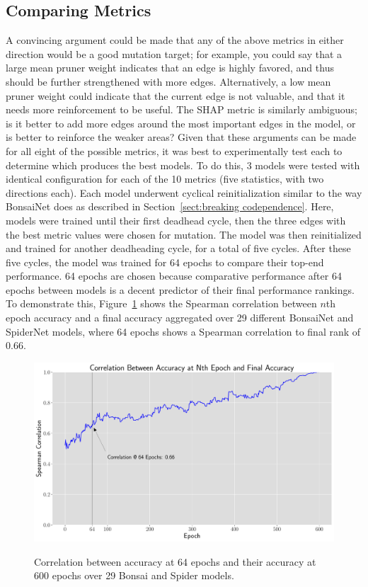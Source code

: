 \subsection{Comparing Metrics}
A convincing argument could be made that any of the above metrics in either direction would be a good mutation target;
for example, you could say that a large mean pruner weight indicates that an edge is highly favored, and thus should
be further strengthened with more edges. Alternatively, a low mean pruner weight could indicate that the current edge is
not valuable, and that it needs more reinforcement to be useful. The SHAP metric is similarly ambiguous; is it better
to add more edges around the most important edges in the model, or is better to reinforce the weaker areas? Given that these arguments can be made for all eight of the
possible metrics, it was best to experimentally test each to determine which produces the best models. To do this,
3 models were tested with identical configuration for each of the 10 metrics (five statistics, with two directions each).
Each model underwent cyclical reinitialization similar to the way BonsaiNet does as described in Section~\ref{sect:breaking codependence}. Here, models were trained until their
first deadhead cycle, then the three edges with the best metric values were chosen for mutation. The model was then reinitialized
and trained for another deadheading cycle, for a total of five cycles. After these five cycles, the model was trained for 64 epochs
to compare their top-end performance. 64 epochs are chosen because comparative performance after 64 epochs between models
is a decent predictor of their final performance rankings. To demonstrate this, Figure~\ref{fig:64epochcorrelations} shows
the Spearman correlation between $n$th epoch accuracy and a final accuracy aggregated over 29 different BonsaiNet and SpiderNet models,
where 64 epochs shows a Spearman correlation to final rank of 0.66.

\begin{figure}[ht]
    \centering
	\includegraphics[width=\textwidth]{model_performance_correlations} \\
	\caption[Correlation between models accuracy at 64 epochs and their accuracy at 600 epochs]{Correlation
between accuracy at 64 epochs and their accuracy at 600 epochs over 29 Bonsai and Spider models.}
	\label{fig:64epochcorrelations}
\end{figure}

